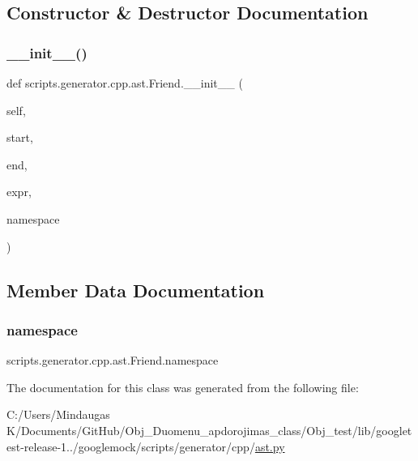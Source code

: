 \subsection{Constructor \& Destructor Documentation}
\mbox{\label{classscripts_1_1generator_1_1cpp_1_1ast_1_1_friend_a04a3eb07abc2c9888e7ba0d1b59c83a9}} 
\subsubsection{\texorpdfstring{\_\_init\_\_()}{\_\_init\_\_()}}
{\footnotesize\ttfamily def scripts.\+generator.\+cpp.\+ast.\+Friend.\+\_\+\+\_\+init\+\_\+\+\_\+ (\begin{DoxyParamCaption}\item[{}]{self,  }\item[{}]{start,  }\item[{}]{end,  }\item[{}]{expr,  }\item[{}]{namespace }\end{DoxyParamCaption})}



\subsection{Member Data Documentation}
\mbox{\label{classscripts_1_1generator_1_1cpp_1_1ast_1_1_friend_a6cd5edc58d322692694657c228256d26}} 
\subsubsection{\texorpdfstring{namespace}{namespace}}
{\footnotesize\ttfamily scripts.\+generator.\+cpp.\+ast.\+Friend.\+namespace}



The documentation for this class was generated from the following file\+:\begin{DoxyCompactItemize}
\item 
C\+:/\+Users/\+Mindaugas K/\+Documents/\+Git\+Hub/\+Obj\+\_\+\+Duomenu\+\_\+apdorojimas\+\_\+class/\+Obj\+\_\+test/lib/googletest-\/release-\/1../googlemock/scripts/generator/cpp/\mbox{\hyperlink{_obj__test_2lib_2googletest-release-1_88_81_2googlemock_2scripts_2generator_2cpp_2ast_8py}{ast.\+py}}\end{DoxyCompactItemize}
